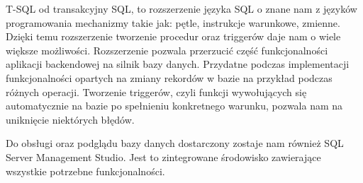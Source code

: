 \documentclass[a4paper,twoside,12pt]{book}
\begin{document}
T-SQL od transakcyjny SQL, to rozszerzenie języka SQL o znane nam z języków programowania mechanizmy takie jak: pętle, instrukcje warunkowe, zmienne. Dzięki temu rozszerzenie tworzenie procedur oraz triggerów daje nam o wiele większe możliwości. Rozszerzenie pozwala przerzucić część funkcjonalności aplikacji backendowej na silnik bazy danych. Przydatne podczas implementacji funkcjonalności opartych na zmiany rekordów w bazie na przykład podczas różnych operacji. Tworzenie triggerów, czyli funkcji wywołujących się automatycznie na bazie po spełnieniu konkretnego warunku, pozwala nam na uniknięcie niektórych błędów.

Do obsługi oraz podglądu bazy danych dostarczony zostaje nam również SQL Server Management Studio. Jest to zintegrowane środowisko zawierające wszystkie potrzebne funkcjonalności. 
\end{document}
